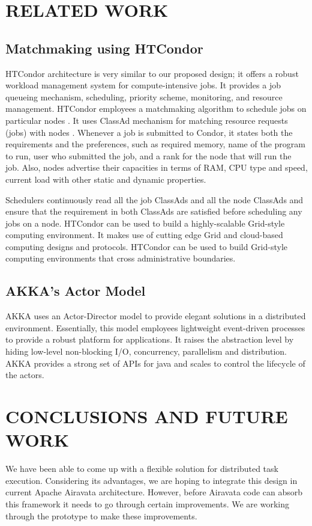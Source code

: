 \documentclass[sigconf]{acmart}
\begin{document}
\section{RELATED WORK}

\subsection{Matchmaking using HTCondor}
HTCondor architecture is very similar to our proposed design; it offers a robust workload management system for compute-intensive jobs. It provides a job queueing mechanism, scheduling, priority scheme, monitoring, and resource management. HTCondor employees a matchmaking algorithm to schedule jobs on particular nodes \cite{coleman2001implementation}. It uses ClassAd mechanism for matching resource requests (jobs) with nodes \cite{coleman2003distributed}. Whenever a job is submitted to Condor, it states both the requirements and the preferences, such as required memory, name of the program to run, user who submitted the job, and a rank for the node that will run the job. Also, nodes advertise their capacities in terms of RAM, CPU type and speed, current load with other static and dynamic properties. \newline

Schedulers continuously read all the job ClassAds and all the node ClassAds and ensure that the requirement in both ClassAds are satisfied before scheduling any jobs on a node. HTCondor can be used to build a highly-scalable Grid-style computing environment.  It makes use of cutting edge Grid and cloud-based computing designs and protocols. HTCondor can be used to build Grid-style computing environments that cross administrative boundaries. 

\subsection{AKKA's Actor Model}
AKKA uses an Actor-Director model to provide elegant solutions in a distributed environment. Essentially, this model employees lightweight event-driven processes to provide a robust platform for applications. It raises the abstraction level by hiding low-level non-blocking I/O, concurrency, parallelism and distribution. AKKA provides a strong set of APIs for java and scales to control the lifecycle of the actors.

\section{CONCLUSIONS AND FUTURE WORK}
We have been able to come up with a flexible solution for distributed task execution. Considering its advantages, we are hoping to integrate this design in current Apache Airavata architecture. However, before Airavata code can absorb this framework it needs to go through certain improvements. We are working through the prototype to make these improvements. \newline
\end{document}
